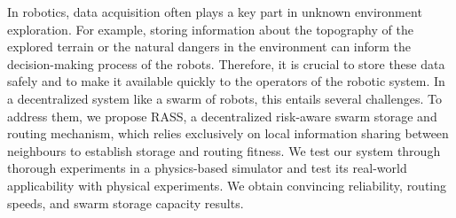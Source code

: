\label{sec:Theme1}

In robotics, data acquisition often plays a key part in
unknown environment exploration. For example, storing information about the topography of the explored terrain or the natural dangers in the environment can
inform the decision-making process of the robots. 
Therefore, it is crucial to store these data safely
and to make it available quickly to the operators of the robotic
system. In a decentralized system like a swarm of robots, this
entails several challenges. To address them, we propose \ac{RASS}, a
decentralized risk-aware swarm storage and routing mechanism,
which relies exclusively on local information sharing between neighbours to establish
storage and routing fitness. We test our system through thorough experiments in a physics-based simulator and test its real-world applicability with physical experiments. We obtain convincing reliability, routing speeds, and swarm storage capacity results.



